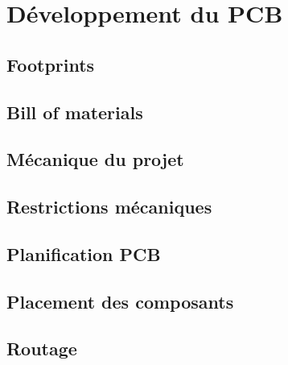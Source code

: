 \section{Développement du PCB}

\subsection{Footprints} \label{ssec:Footprints}
{}
\clearpage

\subsection{Bill of materials} \label{ssec:BOM}
{}
\clearpage

\subsection{Mécanique du projet} \label{ssec:mechProjet}
{}
\clearpage

\subsection{Restrictions mécaniques} \label{ssec:RestrictionMech}
{}
\clearpage

\subsection{Planification PCB} \label{ssec:planifPCB}
{}
\clearpage

\subsection{Placement des composants} \label{ssec:placementComp}
{}
\clearpage

\subsection{Routage} \label{ssec:routage}
{}
\clearpage